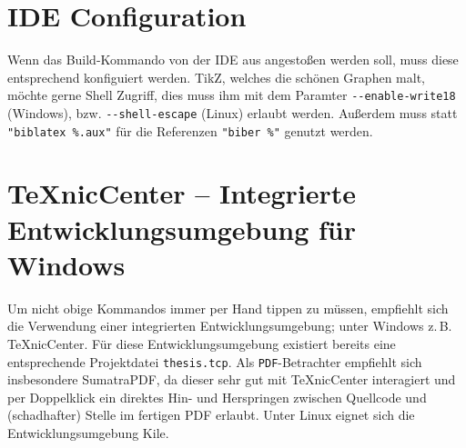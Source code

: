 \section{IDE Configuration}

Wenn das Build-Kommando von der IDE aus angestoßen werden soll, muss diese entsprechend konfiguiert werden.
TikZ, welches die schönen Graphen malt, möchte gerne Shell Zugriff, dies muss ihm mit dem Paramter {\small\verb#--enable-write18#} (Windows), bzw. {\small\verb#--shell-escape#} (Linux) erlaubt werden.
Außerdem muss statt {\small\verb#"biblatex %.aux"#} für die Referenzen {\small\verb#"biber %"#} genutzt werden.

\section{TeXnicCenter -- Integrierte Entwicklungsumgebung für Windows}

Um nicht obige Kommandos immer per Hand tippen zu müssen, empfiehlt sich die
Verwendung einer integrierten
Entwicklungsumgebung; unter 
Windows z.\,B. TeXnicCenter. Für diese Entwicklungsumgebung existiert bereits
eine entsprechende Projektdatei \texttt{thesis.tcp}. Als \texttt{PDF}-Betrachter empfiehlt sich
insbesondere SumatraPDF, da dieser sehr gut mit TeXnicCenter interagiert und
per Doppelklick ein direktes Hin- und Herspringen zwischen Quellcode und
(schadhafter) Stelle im fertigen PDF erlaubt. Unter Linux eignet
sich die Entwicklungsumgebung Kile.

